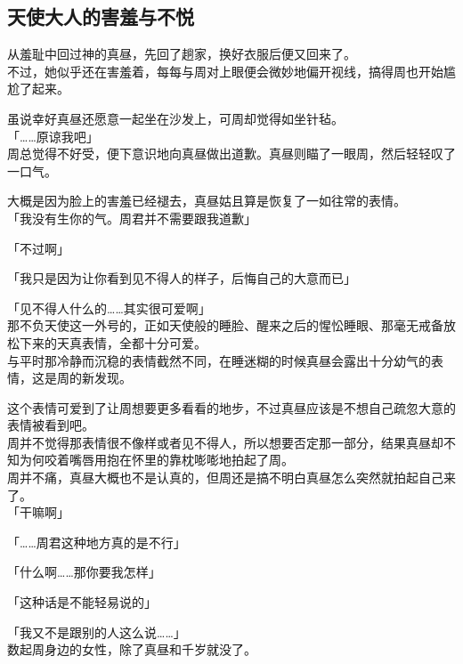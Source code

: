 \subsection{天使大人的害羞与不悦}

从羞耻中回过神的真昼，先回了趟家，换好衣服后便又回来了。\\

不过，她似乎还在害羞着，每每与周对上眼便会微妙地偏开视线，搞得周也开始尴尬了起来。

虽说幸好真昼还愿意一起坐在沙发上，可周却觉得如坐针毡。\\

「……原谅我吧」\\

周总觉得不好受，便下意识地向真昼做出道歉。真昼则瞄了一眼周，然后轻轻叹了一口气。

大概是因为脸上的害羞已经褪去，真昼姑且算是恢复了一如往常的表情。\\

「我没有生你的气。周君并不需要跟我道歉」

「不过啊」

「我只是因为让你看到见不得人的样子，后悔自己的大意而已」

「见不得人什么的……其实很可爱啊」\\

那不负天使这一外号的，正如天使般的睡脸、醒来之后的惺忪睡眼、那毫无戒备放松下来的天真表情，全都十分可爱。\\

与平时那冷静而沉稳的表情截然不同，在睡迷糊的时候真昼会露出十分幼气的表情，这是周的新发现。

这个表情可爱到了让周想要更多看看的地步，不过真昼应该是不想自己疏忽大意的表情被看到吧。\\

周并不觉得那表情很不像样或者见不得人，所以想要否定那一部分，结果真昼却不知为何咬着嘴唇用抱在怀里的靠枕嘭嘭地拍起了周。\\

周并不痛，真昼大概也不是认真的，但周还是搞不明白真昼怎么突然就拍起自己来了。\\

「干嘛啊」

「……周君这种地方真的是不行」

「什么啊……那你要我怎样」

「这种话是不能轻易说的」

「我又不是跟别的人这么说……」\\

数起周身边的女性，除了真昼和千岁就没了。

